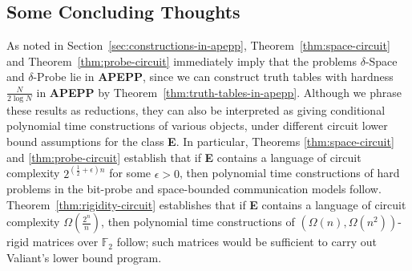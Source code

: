 \documentclass[11pt]{article}
\newcommand{\ttbound}{\frac{N}{2\log N}}
\def\cl{\bf}
\begin{document}
\subsection{Some Concluding Thoughts} As noted in Section~\ref{sec:constructions-in-apepp}, Theorem~\ref{thm:space-circuit} and Theorem~\ref{thm:probe-circuit} immediately imply that the problems {\sc $\delta$-Space} and {\sc $\delta$-Probe} lie in {\cl APEPP}, since we can construct truth tables with hardness $\ttbound$ in {\cl APEPP} by Theorem~\ref{thm:truth-tables-in-apepp}. Although we phrase these results as reductions, they can also be interpreted as giving conditional polynomial time constructions of various objects, under different circuit lower bound assumptions for the class {\cl E}. In particular, Theorems \ref{thm:space-circuit} and \ref{thm:probe-circuit} establish that if {\cl E} contains a language of circuit complexity $2^{(\frac{1}{2} + \epsilon)n}$ for some $\epsilon > 0$, then polynomial time constructions of hard problems in the bit-probe and space-bounded communication models follow. Theorem~\ref{thm:rigidity-circuit} establishes that if {\cl E} contains a language of circuit complexity $\Omega(\frac{2^n}{n})$, then polynomial time constructions of $(\Omega(n), \Omega(n^2))$-rigid matrices over $\mathbb{F}_2$ follow; such matrices would be sufficient to carry out Valiant's lower bound program. 
\end{document}
